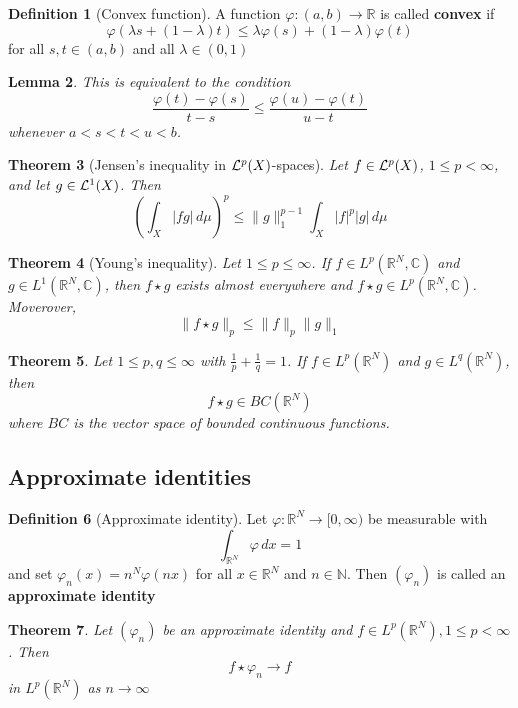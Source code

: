 \documentclass[10pt, oneside, reqno]{amsart}
\theoremstyle{plain}%
\newtheorem{thm}{Theorem}[section]
\newtheorem{lem}[thm]{Lemma}
\theoremstyle{definition}
\newtheorem{defn}[thm]{Definition}
\theoremstyle{remark}
\newcommand{\R}{\mathbb{R}}
\newcommand{\Com}{\mathbb{C}}
\newcommand{\dmu}{\, d \mu}
\renewcommand{\phi}{\varphi}
\begin{document}
\begin{defn}[Convex function]
	A function $\phi : (a,b) \rightarrow \R$ is called \textbf{convex} if \[
		\phi(\lambda s + (1-\lambda)t) \leq \lambda \phi(s) + (1-\lambda) \phi(t)
	\] for all $s,t \in (a,b)$ and all $\lambda \in (0,1)$
\end{defn}

\begin{lem}
	This is equivalent to the condition\[
		\frac{\phi(t) - \phi(s)}{t-s} \leq \frac{\phi(u) - \phi(t)}{u - t}
	\] whenever $a < s < t < u < b$.
\end{lem}

\begin{thm}[Jensen's inequality in $\mathcal{L}^{p}(X)$-spaces]
	Let $f \in \mathcal{L}^{p}(X)$, $1\leq p < \infty$, and let $g \in \mathcal{L}^{1}(X)$.  Then \[
		\left(\int_X |fg| \dmu \right)^p \leq \|g\|^{p-1}_1 \int_X |f|^p |g| \dmu
	\]
\end{thm}

\begin{thm}[Young's inequality]
	Let $1 \leq p \leq \infty$.  If $f \in L^p(\R^N, \Com)$ and $g \in L^1(\R^N, \Com)$, then $f \star g$ exists almost everywhere and $f \star g \in L^p(\R^N, \Com)$.  Moverover, \[
		\|f \star g \|_p \leq \|f\|_p \|g \|_1
	\]
\end{thm}

\begin{thm}
	Let $1 \leq p, q \leq \infty$ with $\frac{1}{p} + \frac{1}{q} = 1$.  If $f \in L^p(\R^N)$ and $g \in L^q(\R^N)$, then \[
		f \star g \in BC(\R^N)
	\] where $BC$ is the vector space of bounded continuous functions.
\end{thm}


\subsection{Approximate identities} %
\label{sub:approximate_identities}

\begin{defn}[Approximate identity]
	Let $\phi: \R^N \rightarrow [0,\infty)$ be measurable with \[
		\int_{\R^N} \phi \, dx = 1
	\] and set $\phi_n(x) = n^N \phi(n x)$ for all $x \in \R^N$ and $n \in \mathbb{N}$.  Then $(\phi_n)$ is called an \textbf{approximate identity}
\end{defn}

\begin{thm}
	Let $(\phi_n)$ be an approximate identity and $f \in L^p(\R^N), 1 \leq p < \infty$.  Then \[
		f \star \phi_n \rightarrow f
	\] in $L^p(\R^N)$ as $n \rightarrow \infty$
\end{thm}
\end{document}

